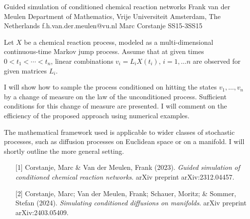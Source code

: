 \begin{talk}
  {Guided simulation of conditioned chemical reaction networks}%
  {Frank van der Meulen}%
  {Department of Mathematics, Vrije Universiteit Amsterdam, The Netherlands}%
  {f.h.van.der.meulen@vu.nl}%
  {Marc Corstanje}%
{}{}{SS15-3}{SS15}

		
			

		Let $X$ be a chemical reaction process, modeled as a multi-dimensional continuous-time Markov jump process.  Assume that at given times $0< t_1 < \cdots <t_n$, linear combinations $v_i = L_i X(t_i),\, i=1,\dots n$ are observed for given matrices $L_i$. 
		
I will show how to sample the process conditioned on hitting the states $v_1,\dots, v_n$ by  a change of measure on the law of the unconditioned process. Sufficient conditions for this change of measure are presented. I will comment on the efficiency of the proposed approach using numerical examples.

The mathematical framework used is applicable to wider classes of stochastic processes, such as diffusion processes on Euclidean space or on a manifold. I will shortly outline the more general setting. 

\medskip

\begin{enumerate}
	\item[{[1]}] Corstanje, Marc \& Van der Meulen, Frank (2023). {\it Guided simulation of conditioned chemical reaction networks}. arXiv preprint arXiv:2312.04457.

\item[{[2]}] Corstanje, Marc; Van der Meulen, Frank; Schauer, Moritz; \& Sommer, Stefan (2024). {\it Simulating conditioned diffusions on manifolds}. arXiv preprint arXiv:2403.05409.
\end{enumerate}

\end{talk}

